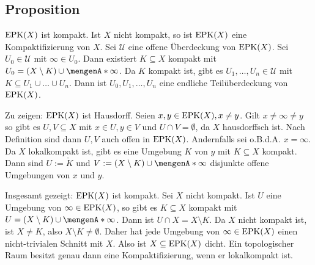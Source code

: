 \subsection[Proposition über Eigenschaften der Einpunktkompaktifizierung]{Proposition} %
\label{sub:57}
$\operatorname{EPK}(X)$ ist kompakt. Ist $X$ nicht kompakt, so ist $\operatorname{EPK}(X)$ eine Kompaktifizierung von $X$.
Sei $\mathcal{U}$ eine offene Überdeckung von $\operatorname{EPK}(X)$. Sei $U_0 \in \mathcal{U}$ mit $\infty \in U_0$. Dann existiert $K \subseteq X$ kompakt mit 
$U_0 = (X \setminus K) \cup \set{\infty}$. Da $K$ kompakt ist, gibt es $U_1, \ldots , U_n \in \mathcal{U}$ mit $K \subseteq U_1 \cup \ldots \cup U_n$. Dann ist
$U_0, U_1, \ldots , U_n$ eine endliche Teilüberdeckung von $\operatorname{EPK}(X)$.

Zu zeigen: $\operatorname{EPK}(X)$ ist Hausdorff. Seien $x,y \in \operatorname{EPK}(X), x \not= y$. Gilt $x \not= \infty \not= y$ so gibt es $U,V \subseteq X$ mit $x \in U,  y \in V$ und 
$U\cap V = \emptyset$, da $X$ hausdorffsch ist. Nach Definition sind dann $U,V$ auch offen in $\operatorname{EPK}(X)$. Andernfalls sei o.B.d.A. $x = \infty$. Da $X$ lokalkompakt ist, 
gibt es eine Umgebung $K$ von $y$ mit $K \subseteq X$ kompakt. Dann sind $U := \mathring K$ und $V := (X \setminus K) \cup \set{\infty} $ disjunkte offene Umgebungen von 
$x$ und $y$.

Insgesamt gezeigt: $\operatorname{EPK}(X)$ ist kompakt. Sei $X$ nicht kompakt. Ist $U$ eine Umgebung von $\infty \in \operatorname{EPK}(X)$, so gibt es $K \subseteq X$ kompakt mit 
$U = (X \setminus K) \cup \set{\infty}$. Dann ist $U \cap X = X \setminus K$. Da $X$ nicht kompakt ist, ist $X \not= K$, also $X \setminus K  \not= \emptyset$. 
Daher hat jede Umgebung von $\infty \in \operatorname{EPK}(X)$ einen nicht-trivialen Schnitt mit $X$. Also ist $X  \subseteq \operatorname{EPK}(X)$ dicht. \bewende
{}
Ein topologischer Raum besitzt genau dann eine Kompaktifizierung, wenn er lokalkompakt ist.

